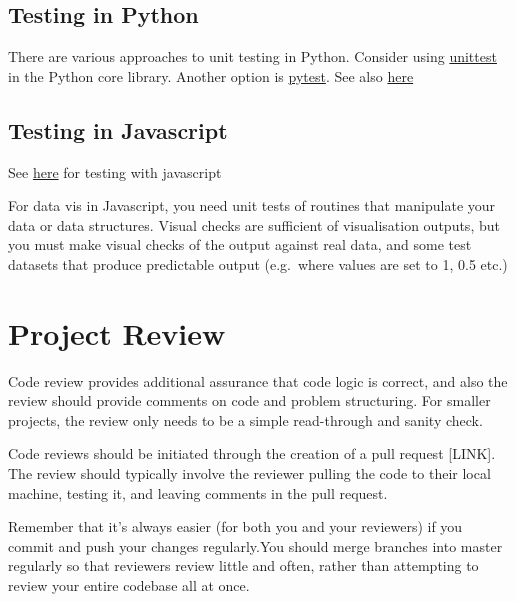 \documentclass[]{book}
\begin{document}
\hypertarget{testing-in-python}{%
\subsection*{Testing in Python}\label{testing-in-python}}

There are various approaches to unit testing in Python. Consider using \href{https://docs.python.org/3/library/unittest.html}{unittest} in the Python core library. Another option is \href{https://docs.pytest.org/en/latest/}{pytest}. See also \href{http://python-guide-pt-br.readthedocs.io/en/latest/writing/tests/}{here}

\hypertarget{testing-in-javascript}{%
\subsection*{Testing in Javascript}\label{testing-in-javascript}}

See \href{http://busypeoples.github.io/post/testing-d3-with-jasmine/}{here} for testing with javascript

For data vis in Javascript, you need unit tests of routines that manipulate your data or data structures. Visual checks are sufficient of visualisation outputs, but you must make visual checks of the output against real data, and some test datasets that produce predictable output (e.g.~where values are set to 1, 0.5 etc.)

\hypertarget{review}{%
\section{Project Review}\label{review}}

Code review provides additional assurance that code logic is correct, and also the review should provide comments on code and problem structuring. For smaller projects, the review only needs to be a simple read-through and sanity check.

Code reviews should be initiated through the creation of a pull request {[}LINK{]}. The review should typically involve the reviewer pulling the code to their local machine, testing it, and leaving comments in the pull request.

Remember that it's always easier (for both you and your reviewers) if you commit and push your changes regularly.You should merge branches into master regularly so that reviewers review little and often, rather than attempting to review your entire codebase all at once.
\end{document}
